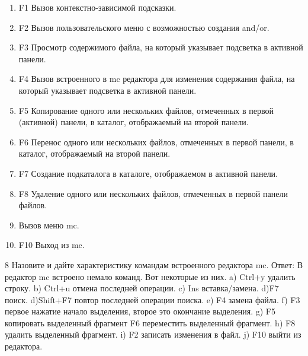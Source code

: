 \documentclass[
  english,
  russian,
  12pt,
  a4paper,
  DIV=11,
  numbers=noendperiod]{scrreprt}
\providecommand{\tightlist}{%
  \setlength{\itemsep}{0pt}\setlength{\parskip}{0pt}}
\begin{document}
\begin{enumerate}
\def\labelenumi{\alph{enumi})}
\tightlist
\item
  F1 Вызов контекстно-зависимой подсказки.
\item
  F2 Вызов пользовательского меню с возможностью создания and/or.
\item
  F3 Просмотр содержимого файла, на который указывает подсветка в
  активной панели.
\item
  F4 Вызов встроенного в mc редактора для изменения содержания файла, на
  который указывает подсветка в активной панели.
\item
  F5 Копирование одного или нескольких файлов, отмеченных в первой
  (активной) панели, в каталог, отображаемый на второй панели.
\item
  F6 Перенос одного или нескольких файлов, отмеченных в первой панели, в
  каталог, отображаемый на второй панели.
\item
  F7 Создание подкаталога в каталоге, отображаемом в активной панели.
\item
  F8 Удаление одного или нескольких файлов, отмеченных в первой панели
  файлов.
\item
  Вызов меню mc.
\item
  F10 Выход из mc.
\end{enumerate}

8 Назовите и дайте характеристику командам встроенного редактора mc.
Ответ: В редактор mc встроено немало команд. Вот некоторые из них. a)
Ctrl+y удалить строку. b) Ctrl+u отмена последней операции. c) Ins
вставка/замена. d)F7 поиск. d)Shift+F7 повтор последней операции поиска.
e) F4 замена файла. f) F3 первое нажатие начало выделения, второе это
окончание выделения. g) F5 копировать выделенный фрагмент F6 переместить
выделенный фрагмент. h) F8 удалить выделенный фрагмент. i) F2 записать
изменения в файл. j) F10 выйти из редактора.
\end{document}
